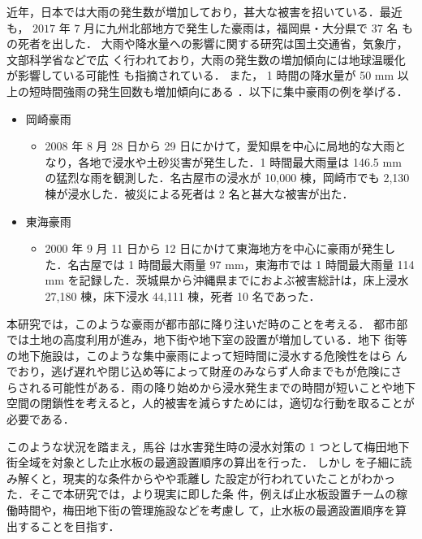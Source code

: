 \documentclass[a4paper,12pt,fleqn]{jarticle}
\begin{document}
近年，日本では大雨の発生数が増加しており，甚大な被害を招いている．最近も，
$2017$ 年 $7$ 月に九州北部地方で発生した豪雨は，福岡県・大分県で $37$ 名
もの死者を出した．
%
大雨や降水量への影響に関する研究は国土交通省，気象庁，文部科学省などで広
く行われており，大雨の発生数の増加傾向には地球温暖化が影響している可能性
も指摘されている．
%
%
また， 1 時間の降水量が 50 mm 以上の短時間強雨の発生回数も増加傾向にある
\cite{集中豪雨の増加傾向と水害への対策}．以下に集中豪雨の例を挙げる．

\begin{itemize}
\item 岡崎豪雨\cite{岡崎豪雨}
\begin{itemize}
\item 2008 年 8 月 28 日から 29 日にかけて，愛知県を中心に局地的な大雨となり，各地で浸水や土砂災害が発生した．1 時間最大雨量は 146.5 mm の猛烈な雨を観測した．名古屋市の浸水が 10,000 棟，岡崎市でも 2,130 棟が浸水した．被災による死者は 2 名と甚大な被害が出た．
\end{itemize}
\end{itemize}

\begin{itemize}
\item 東海豪雨\cite{東海豪雨}
\begin{itemize}
\item 2000 年 9 月 11 日から 12 日にかけて東海地方を中心に豪雨が発生した．名古屋では 1 時間最大雨量 97 mm，東海市では 1 時間最大雨量 114 mm を記録した．茨城県から沖縄県までにおよぶ被害総計は，床上浸水 27,180 棟，床下浸水 44,111 棟，死者 10 名であった．
\end{itemize}
\end{itemize}

本研究では，このような豪雨が都市部に降り注いだ時のことを考える．
%
都市部では土地の高度利用が進み，地下街や地下室の設置が増加している．地下
街等の地下施設は，このような集中豪雨によって短時間に浸水する危険性をはら
んでおり，逃げ遅れや閉じ込め等によって財産のみならず人命までもが危険にさ
らされる可能性がある．雨の降り始めから浸水発生までの時間が短いことや地下
空間の閉鎖性を考えると，人的被害を減らすためには，適切な行動を取ることが
必要である．

このような状況を踏まえ，馬谷 \cite{馬谷さん卒論} は水害発生時の浸水対策の
1 つとして梅田地下街全域を対象とした止水板の最適設置順序の算出を行った．
しかし \cite{馬谷さん卒論} を子細に読み解くと，現実的な条件からやや乖離し
た設定が行われていたことがわかった．そこで本研究では，より現実に即した条
件，例えば止水板設置チームの稼働時間や，梅田地下街の管理施設などを考慮し
て，止水板の最適設置順序を算出することを目指す．
\end{document}
